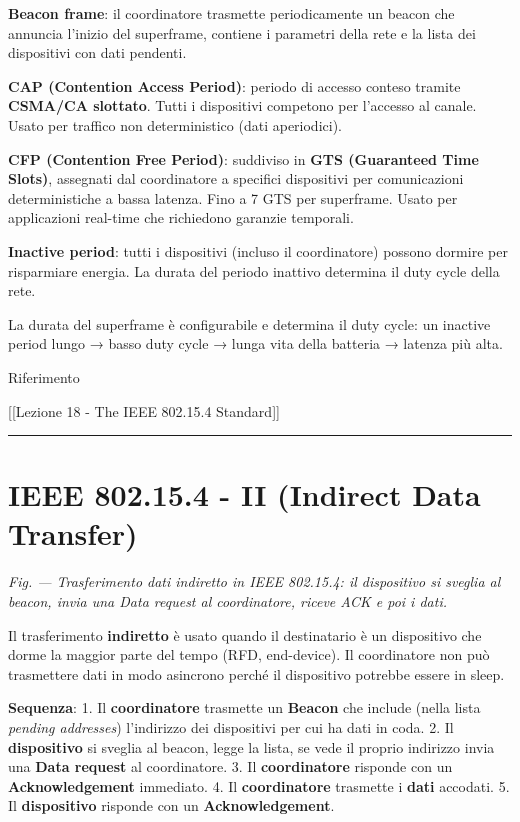 \documentclass[
  italian,
  openany]{book}
\begin{document}
\textbf{Beacon frame}: il coordinatore trasmette periodicamente un
beacon che annuncia l'inizio del superframe, contiene i parametri della
rete e la lista dei dispositivi con dati pendenti.

\textbf{CAP (Contention Access Period)}: periodo di accesso conteso
tramite \textbf{CSMA/CA slottato}. Tutti i dispositivi competono per
l'accesso al canale. Usato per traffico non deterministico (dati
aperiodici).

\textbf{CFP (Contention Free Period)}: suddiviso in \textbf{GTS
(Guaranteed Time Slots)}, assegnati dal coordinatore a specifici
dispositivi per comunicazioni deterministiche a bassa latenza. Fino a 7
GTS per superframe. Usato per applicazioni real-time che richiedono
garanzie temporali.

\textbf{Inactive period}: tutti i dispositivi (incluso il coordinatore)
possono dormire per risparmiare energia. La durata del periodo inattivo
determina il duty cycle della rete.

La durata del superframe è configurabile e determina il duty cycle: un
inactive period lungo → basso duty cycle → lunga vita della batteria →
latenza più alta.

\begin{calloutnote}{Riferimento}

{[}{[}Lezione 18 - The IEEE 802.15.4 Standard{]}{]}

\end{calloutnote}

\begin{center}\rule{0.5\linewidth}{0.5pt}\end{center}

\section{IEEE 802.15.4 - II (Indirect Data
Transfer)}\label{ieee-802.15.4---ii-indirect-data-transfer}

\emph{Fig. --- Trasferimento dati indiretto in IEEE 802.15.4: il
dispositivo si sveglia al beacon, invia una Data request al
coordinatore, riceve ACK e poi i dati.}

Il trasferimento \textbf{indiretto} è usato quando il destinatario è un
dispositivo che dorme la maggior parte del tempo (RFD, end-device). Il
coordinatore non può trasmettere dati in modo asincrono perché il
dispositivo potrebbe essere in sleep.

\textbf{Sequenza}: 1. Il \textbf{coordinatore} trasmette un
\textbf{Beacon} che include (nella lista \emph{pending addresses})
l'indirizzo dei dispositivi per cui ha dati in coda. 2. Il
\textbf{dispositivo} si sveglia al beacon, legge la lista, se vede il
proprio indirizzo invia una \textbf{Data request} al coordinatore. 3. Il
\textbf{coordinatore} risponde con un \textbf{Acknowledgement}
immediato. 4. Il \textbf{coordinatore} trasmette i \textbf{dati}
accodati. 5. Il \textbf{dispositivo} risponde con un
\textbf{Acknowledgement}.
\end{document}
